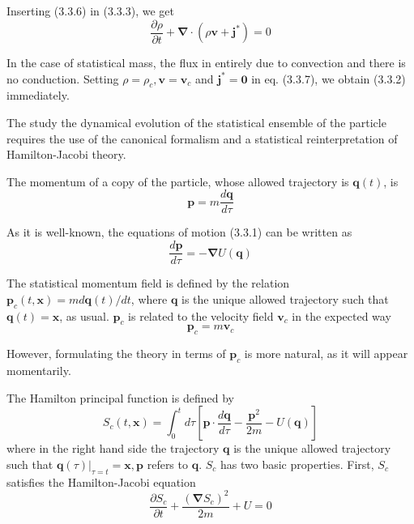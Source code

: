 \documentclass{article}
\begin{document}
Inserting (3.3.6) in (3.3.3), we get
$$
\begin{equation*}
\frac{\partial \rho}{\partial t}+\boldsymbol{\nabla} \cdot\left(\rho \boldsymbol{v}+\boldsymbol{j}^{*}\right)=0 \tag{3.3.7}
\end{equation*}
$$

In the case of statistical mass, the flux in entirely due to convection and there is no conduction. Setting $\rho=\rho_{c}, \boldsymbol{v}=\boldsymbol{v}_{c}$ and $\boldsymbol{j}^{*}=\mathbf{0}$ in eq. (3.3.7), we obtain (3.3.2) immediately.

The study the dynamical evolution of the statistical ensemble of the particle requires the use of the canonical formalism and a statistical reinterpretation of Hamilton-Jacobi theory.

The momentum of a copy of the particle, whose allowed trajectory is $\boldsymbol{q}(t)$, is
$$
\begin{equation*}
\boldsymbol{p}=m \frac{d \boldsymbol{q}}{d \tau} \tag{3.3.8}
\end{equation*}
$$

As it is well-known, the equations of motion (3.3.1) can be written as
$$
\begin{equation*}
\frac{d \boldsymbol{p}}{d \tau}=-\boldsymbol{\nabla} U(\boldsymbol{q}) \tag{3.3.9}
\end{equation*}
$$

The statistical momentum field is defined by the relation $\boldsymbol{p}_{c}(t, \boldsymbol{x})=m d \boldsymbol{q}(t) / d t$, where $\boldsymbol{q}$ is the unique allowed trajectory such that $\boldsymbol{q}(t)=\boldsymbol{x}$, as usual. $\boldsymbol{p}_{c}$ is related to the velocity field $\boldsymbol{v}_{c}$ in the expected way
$$
\begin{equation*}
\boldsymbol{p}_{c}=m \boldsymbol{v}_{c} \tag{3.3.10}
\end{equation*}
$$

However, formulating the theory in terms of $\boldsymbol{p}_{c}$ is more natural, as it will appear momentarily.

The Hamilton principal function is defined by
$$
\begin{equation*}
S_{c}(t, \boldsymbol{x})=\int_{0}^{t} d \tau\left[\boldsymbol{p} \cdot \frac{d \boldsymbol{q}}{d \tau}-\frac{\boldsymbol{p}^{2}}{2 m}-U(\boldsymbol{q})\right] \tag{3.3.11}
\end{equation*}
$$
where in the right hand side the trajectory $\boldsymbol{q}$ is the unique allowed trajectory such that $\left.\boldsymbol{q}(\tau)\right|_{\tau=t}=\boldsymbol{x}, \boldsymbol{p}$ refers to $\boldsymbol{q}$. $S_{c}$ has two basic properties. First, $S_{c}$ satisfies the Hamilton-Jacobi equation
$$
\begin{equation*}
\frac{\partial S_{c}}{\partial t}+\frac{\left(\boldsymbol{\nabla} S_{c}\right)^{2}}{2 m}+U=0 \tag{3.3.12}
\end{equation*}
$$
\end{document}
